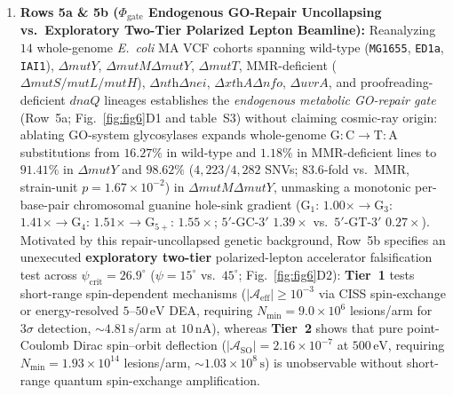\documentclass[10pt,letterpaper]{article}
\theoremstyle{plain}
\theoremstyle{definition}
\begin{document}
\begin{enumerate}[leftmargin=1.8em,itemsep=2pt]
    \item \textbf{Rows 5a \& 5b ($\Phi_{\mathrm{gate}}$ Endogenous GO-Repair Uncollapsing vs.\ Exploratory Two-Tier Polarized Lepton Beamline):} Reanalyzing $14$ whole-genome \emph{E.\ coli} MA VCF cohorts spanning wild-type (\texttt{MG1655}, \texttt{ED1a}, \texttt{IAI1}), $\Delta\textit{mutY}$, $\Delta\textit{mutM}\Delta\textit{mutY}$, $\Delta\textit{mutT}$, MMR-deficient ($\Delta\textit{mutS}/\textit{mutL}/\textit{mutH}$), $\Delta\textit{nth}\Delta\textit{nei}$, $\Delta\textit{xthA}\Delta\textit{nfo}$, $\Delta\textit{uvrA}$, and proofreading-deficient $\textit{dnaQ}$ lineages \cite{foster2015pnas,garushyants2024gbe} establishes the \emph{endogenous metabolic GO-repair gate} (Row~5a; Fig.~\ref{fig:fig6}D1 and table~S3) without claiming cosmic-ray origin: ablating GO-system glycosylases expands whole-genome $\mathrm{G{:}C \to T{:}A}$ substitutions from $16.27\%$ in wild-type and $1.18\%$ in MMR-deficient lines to $91.41\%$ in $\Delta\textit{mutY}$ and $98.62\%$ ($4{,}223 / 4{,}282$ SNVs; $83.6$-fold vs.\ MMR, strain-unit $p = 1.67 \times 10^{-2}$) in $\Delta\textit{mutM}\Delta\textit{mutY}$, unmasking a monotonic per-base-pair chromosomal guanine hole-sink gradient ($\mathrm{G}_1$: $1.00\times \to \mathrm{G}_3$: $1.41\times \to \mathrm{G}_4$: $1.51\times \to \mathrm{G}_{5+}$: $1.55\times$; $5'\text{-}\mathrm{GC}\text{-}3'$ $1.39\times$ vs.\ $5'\text{-}\mathrm{GT}\text{-}3'$ $0.27\times$). Motivated by this repair-uncollapsed genetic background, Row~5b specifies an unexecuted \textbf{exploratory two-tier} polarized-lepton accelerator falsification test across $\psi_{\mathrm{crit}} = 26.9^\circ$ ($\psi = 15^\circ$ vs.\ $45^\circ$; Fig.~\ref{fig:fig6}D2): \textbf{Tier~1} tests short-range spin-dependent mechanisms ($|\mathcal{A}_{\mathrm{eff}}| \ge 10^{-3}$ via CISS spin-exchange or energy-resolved $5$--$50\,\mathrm{eV}$ DEA, requiring $N_{\min} = 9.0 \times 10^6$ lesions/arm for $3\sigma$ detection, $\sim 4.81\,\mathrm{s}$/arm at $10\,\mathrm{nA}$), whereas \textbf{Tier~2} shows that pure point-Coulomb Dirac spin--orbit deflection ($|\mathcal{A}_{\mathrm{SO}}| = 2.16 \times 10^{-7}$ at $500\,\mathrm{eV}$, requiring $N_{\min} = 1.93 \times 10^{14}$ lesions/arm, $\sim 1.03 \times 10^8\,\mathrm{s}$) is unobservable without short-range quantum spin-exchange amplification.
\end{enumerate}
\end{document}
